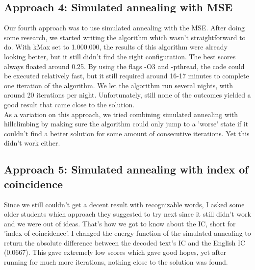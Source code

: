 \documentclass{article}
\begin{document}
\subsection{Approach 4: Simulated annealing with MSE}
Our fourth approach was to use simulated annealing with the MSE. After doing some research, we started writing the algorithm which wasn't straightforward to do. With kMax set to 1.000.000, the results of this algorithm were already looking better, but it still didn't find the right configuration. The best scores always floated around 0.25. By using the flags -O3 and -pthread, the code could be executed relatively fast, but it still required around 16-17 minutes to complete one iteration of the algorithm. We let the algorithm run several nights, with around 20 iterations per night. Unfortunately, still none of the outcomes yielded a good result that came close to the solution.\\

\noindent As a variation on this approach, we tried combining simulated annealing with hillclimbing by making sure the algorithm could only jump to a 'worse' state if it couldn't find a better solution for some amount of consecutive iterations. Yet this didn't work either.

\subsection{Approach 5: Simulated annealing with index of coincidence}
Since we still couldn't get a decent result with recognizable words, I asked some older students which approach they suggested to try next since it still didn't work and we were out of ideas. That's how we got to know about the IC, short for 'index of coincidence'. I changed the energy function of the simulated annealing to return the absolute difference between the decoded text's IC and the English IC (0.0667). This gave extremely low scores which gave good hopes, yet after running for much more iterations, nothing close to the solution was found.
\end{document}
